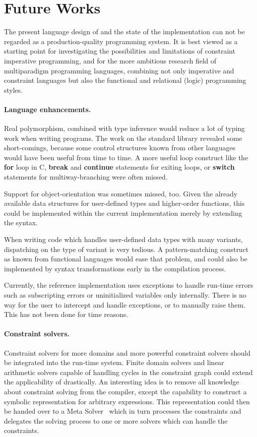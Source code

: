 \section{Future Works}
\label{sec:future-works}

The present language design of \turtle{} and the state of the
implementation can not be regarded as a production-quality programming
system.  It is best viewed as a starting point for investigating the
possibilities and limitations of constraint imperative programming,
and for the more ambitious research field of multiparadigm programming
languages, combining not only imperative and constraint languages but
also the functional and relational (logic) programming styles.

\paragraph{Language enhancements.}
 Real polymorphism, combined with type
inference would reduce a lot of typing work when writing \turtle{}
programs.  The work on the standard library revealed some
short-comings, because some control structures known from other
languages would have been useful from time to time.  A more useful
loop construct like the {\bf for} loop in C, {\bf break} and {\bf
  continue} statements for exiting loops, or {\bf switch} statements
for multiway-branching were often missed.

Support for object-orientation was sometimes missed, too.  Given the
already available data structures for user-defined types and
higher-order functions, this could be implemented within the current
implementation merely by extending the syntax.

When writing code which handles user-defined data types with many
variants, dispatching on the type of variant is very tedious.  A
pattern-matching construct as known from functional languages would
ease that problem, and could also be implemented by syntax
transformations early in the compilation process.

Currently, the \turtle{} reference implementation uses exceptions to
handle run-time errors such as subscripting errors or uninitialized
variables only internally.  There is no way for the user to intercept
and handle exceptions, or to manually raise them.  This has not been
done for time reasons.

\paragraph{Constraint solvers.}
Constraint solvers for more domains and more powerful constraint
solvers should be integrated into the \turtle{} run-time system.
Finite domain solvers and linear arithmetic solvers capable of
handling cycles in the constraint graph could extend the applicability
of \turtle{} drastically.  An interesting idea is to remove all
knowledge about constraint solving from the compiler, except the
capability to construct a symbolic representation for arbitrary
expressions.  This representation could then be handed over to a Meta
Solver~\cite{hofstedt2001diss} which in turn processes the constraints
and delegates the solving process to one or more solvers which can
handle the constraints.

